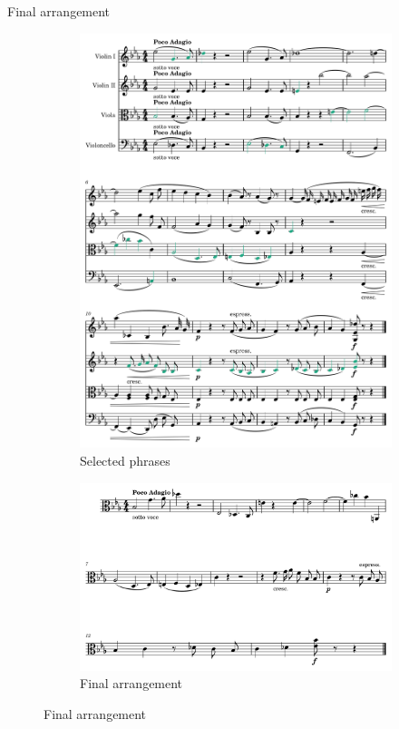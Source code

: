 \documentclass[handout]{beamer}
\begin{document}
\begin{frame}{Final arrangement}
    \begin{figure}
        \begin{subfigure}{0.5\linewidth}
            \includegraphics[width=.95\linewidth]{../Figures/selected-1.png}
            \caption{Selected phrases}
        \end{subfigure}\hfill
        \begin{subfigure}{0.5\linewidth}
            \includegraphics[width=.95\linewidth]{../Figures/arrangement-1.png}
            \caption{Final arrangement}
        \end{subfigure}
    \end{figure}
\end{frame}
\end{document}
